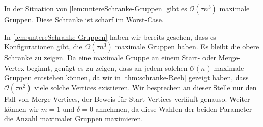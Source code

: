 \begin{satz}[name={\cite[Thm.~5]{buchin2015}},label=satz:obereSchranke-Gruppen]
	In der Situation von \cref{lem:untereSchranke-Gruppen} gibt es $\mathcal{O}(\tau n^3)$ maximale Gruppen.
	Diese Schranke ist scharf im Worst-Case.
\end{satz}
\begin{beweis}
	In \cref{lem:untereSchranke-Gruppen} haben wir bereits gesehen, dass es Konfigurationen gibt, die $\Omega(\tau n^3)$ maximale Gruppen haben.
	Es bleibt die obere Schranke zu zeigen.
	Da eine maximale Gruppe an einem Start- oder Merge-Vertex beginnt, genügt es zu zeigen, dass an jedem solchen $\mathcal{O}(n)$ maximale Gruppen entstehen können, da wir in \cref{thm:schranke-Reeb} gezeigt haben, dass $\mathcal{O}(\tau n^2)$ viele solche Vertices existieren.
	Wir besprechen an dieser Stelle nur den Fall von Merge-Vertices, der Beweis für Start-Vertices verläuft genauso.
	Weiter können wir $m=1$ und $\delta=0$ annehmen, da diese Wahlen der beiden Parameter die Anzahl maximaler Gruppen maximieren.
	

\end{beweis}

